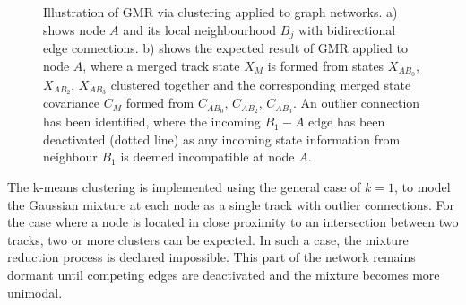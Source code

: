 \begin{figure}[htbp!] 
    \centering
    \hfill%
    \caption{Illustration of GMR via clustering applied to graph networks. a) shows node $A$ and its local neighbourhood $B_j$ with bidirectional edge connections. b) shows the expected result of GMR applied to node $A$, where a merged track state $X_M$ is formed from states $X_{AB_0}$, $X_{AB_2}$, $X_{AB_3}$ clustered together and the corresponding merged state covariance $C_M$ formed from $C_{AB_0}$, $C_{AB_2}$, $C_{AB_3}$. An outlier connection has been identified, where the incoming $B_1 - A$ edge has been deactivated (dotted line) as any incoming state information from neighbour $B_1$ is deemed incompatible at node $A$.}
    \label{fig:GMR-example}
\end{figure}

The k-means clustering is implemented using the general case of $k=1$, to model the Gaussian mixture at each node as a single track with outlier connections. For the case where a node is located in close proximity to an intersection between two tracks, two or more clusters can be expected. In such a case, the mixture reduction process is declared impossible. This part of the network remains dormant until competing edges are deactivated and the mixture becomes more unimodal. 


